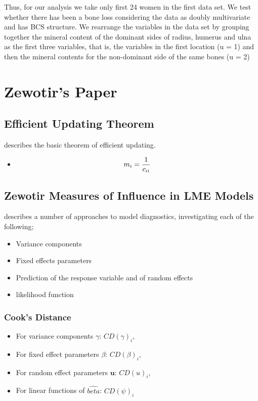 \documentclass[12pt, a4paper]{report}
\theoremstyle{plain}
\theoremstyle{definition}
\theoremstyle{remark}
\begin{document}
Thus, for our analysis
we take only ﬁrst 24 women in the ﬁrst data set. We test whether there has been a bone loss
considering the data as doubly multivariate and has BCS structure. We rearrange the variables
in the data set by grouping together the mineral content of the dominant sides of radius, humerus
and ulna as the ﬁrst three variables, that is, the variables in the ﬁrst location (u = 1) and then
the mineral contents for the non-dominant side of the same bones (u = 2)


\chapter{Zewotir's Paper}



\section{Efficient Updating Theorem}
\citet{Zewotir} describes the basic theorem of efficient updating.
\begin{itemize}
\item \[ m_i = {1 \over c_{ii}}\]
\end{itemize}
\section{Zewotir Measures of Influence in LME Models}
\citet{Zewotir} describes a number of approaches to model diagnostics, investigating each of the following;
\begin{itemize}
\item Variance components
\item Fixed effects parameters
\item Prediction of the response variable and of random effects
\item likelihood function
\end{itemize}

\subsection{Cook's Distance}
\begin{itemize}
\item For variance components $\gamma$: $CD(\gamma)_i$,
\item For fixed effect parameters $\beta$: $CD(\beta)_i$,
\item For random effect parameters $\boldsymbol{u}$: $CD(u)_i$,
\item For linear functions of $\hat{beta}$: $CD(\psi)_i$
\end{itemize}
\end{document}
